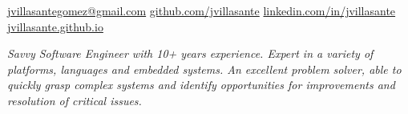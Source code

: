 \documentclass[10pt,a4paper]{article}
\begin{document}
\sloppy  %


\nobreakvspace{0.3em}  %

\noindent\href{mailto:jvillasantegomez.at.gmail.dot.com}{jvillasantegomez\mbox{}@\mbox{}gmail.com}\sbull
\noindent\href{https://github.com/jvillasante}{github.com/jvillasante}\sbull
\noindent\href{https://linkedin.com/in/jvillasante}{linkedin.com/in/jvillasante}\sbull
\noindent\href{https://jvillasante.github.io}{jvillasante.github.io}
\\

\emph{Savvy Software Engineer with 10+ years experience. Expert in a variety of platforms, languages and embedded systems. An excellent problem solver, able to quickly grasp complex systems and identify opportunities for improvements and resolution of critical issues.}
\\

\spacedhrule{0em}{-0.4em}

\end{document}
